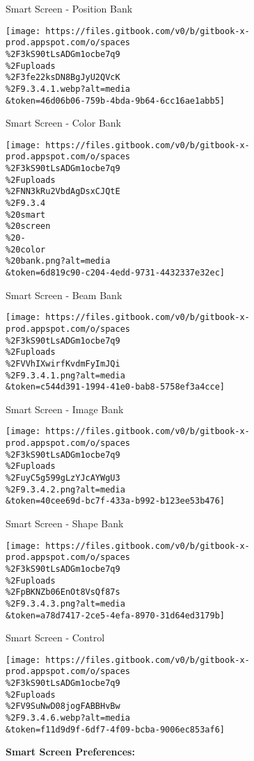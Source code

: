 \documentclass[
]{article}
\begin{document}
Smart Screen - Position Bank

\texttt{[image: https://files.gitbook.com/v0/b/gitbook-x-prod.appspot.com/o/spaces\\\%2F3kS90tLsADGm1ocbe7q9\\\%2Fuploads\\\%2F3fe22ksDN8BgJyU2QVcK\\\%2F9.3.4.1.webp?alt=media\\\&token=46d06b06-759b-4bda-9b64-6cc16ae1abb5]}

Smart Screen - Color Bank

\texttt{[image: https://files.gitbook.com/v0/b/gitbook-x-prod.appspot.com/o/spaces\\\%2F3kS90tLsADGm1ocbe7q9\\\%2Fuploads\\\%2FNN3kRu2VbdAgDsxCJQtE\\\%2F9.3.4\\\%20smart\\\%20screen\\\%20-\\\%20color\\\%20bank.png?alt=media\\\&token=6d819c90-c204-4edd-9731-4432337e32ec]}

Smart Screen - Beam Bank

\texttt{[image: https://files.gitbook.com/v0/b/gitbook-x-prod.appspot.com/o/spaces\\\%2F3kS90tLsADGm1ocbe7q9\\\%2Fuploads\\\%2FVVhIXwirfKvdmFyImJQi\\\%2F9.3.4.1.png?alt=media\\\&token=c544d391-1994-41e0-bab8-5758ef3a4cce]}

Smart Screen - Image Bank

\texttt{[image: https://files.gitbook.com/v0/b/gitbook-x-prod.appspot.com/o/spaces\\\%2F3kS90tLsADGm1ocbe7q9\\\%2Fuploads\\\%2FuyC5g599gLzYJcAYWgU3\\\%2F9.3.4.2.png?alt=media\\\&token=40cee69d-bc7f-433a-b992-b123ee53b476]}

Smart Screen - Shape Bank

\texttt{[image: https://files.gitbook.com/v0/b/gitbook-x-prod.appspot.com/o/spaces\\\%2F3kS90tLsADGm1ocbe7q9\\\%2Fuploads\\\%2FpBKNZb06EnOt8VsQf87s\\\%2F9.3.4.3.png?alt=media\\\&token=a78d7417-2ce5-4efa-8970-31d64ed3179b]}

Smart Screen - Control

\texttt{[image: https://files.gitbook.com/v0/b/gitbook-x-prod.appspot.com/o/spaces\\\%2F3kS90tLsADGm1ocbe7q9\\\%2Fuploads\\\%2FV9SuNwD08jogFABBHvBw\\\%2F9.3.4.6.webp?alt=media\\\&token=f11d9d9f-6df7-4f09-bcba-9006ec853af6]}

\textbf{Smart Screen Preferences:}
\end{document}
